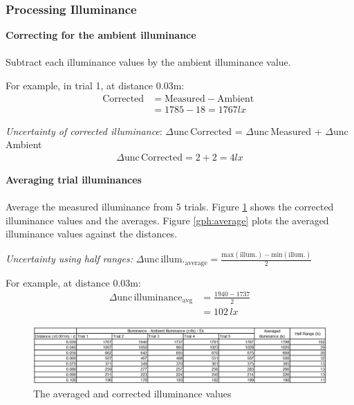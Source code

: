 \documentclass[a4paper,12pt]{article}
\newcommand{\absun}{\Delta \text{unc}\,}
\newcommand{\paragraphnl}[1]{\textbf{#1}\\\\}
\begin{document}
\subsubsection{Processing Illuminance}

\paragraphnl{Correcting for the ambient illuminance}
Subtract each illuminance values by the ambient illuminance value.

For example, in trial 1, at distance 0.03m:
\begin{align*}
    \text{Corrected} &= \text{Measured} - \text{Ambient }\\
    &= 1785 - 18 = 1767 \si{lx}
\end{align*}

\textit{Uncertainty of corrected illuminance}: $\absun$Corrected = $\absun$Measured + $\absun$Ambient
\begin{align*}
     \absun \text{Corrected} = 2 + 2 = 4\si{lx}
\end{align*}


\paragraphnl{Averaging trial illuminances}
Average the measured illuminance from 5 trials. Figure \ref{fig:average} shows the corrected illuminance values and the averages. Figure \ref{gph:average} plots the averaged illuminance values against the distances.

\textit{Uncertainty using half ranges:} $\absun \text{illum.}_{\text{average}} = \frac{\text{max}(\text{illum}.) - \text{min}(\text{illum}.)}{2}$

For example, at distance 0.03m:
\begin{align*}
 \absun \text{illuminance}_{\text{avg}} &= \frac{1940-1737}{2}\\
 &= 102 \,\si{lx}
\end{align*}


\begin{figure}[H]
    \centering
    \includegraphics[width=\textwidth]{assets/averagedata.png}
    \caption{The averaged and corrected illuminance values}
    \label{fig:average}
\end{figure}
\end{document}
